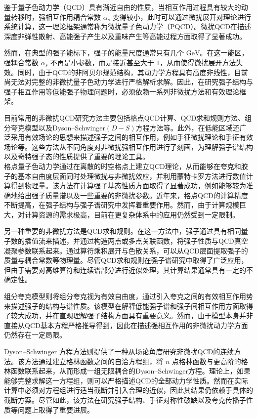 鉴于量子色动力学（QCD）具有渐近自由的性质，当相互作用过程具有较大的动量转移时，强相互作用耦合常数 $\alpha_s$ 变得较小，此时可以通过微扰展开对理论进行系统计算，这一理论框架通常称为微扰量子色动力学（PQCD）。微扰QCD在描述深度非弹性散射、高能强子产生以及重味产生等高能过程方面取得了显著成功。

然而，在典型的强子能标下，强子的能量尺度通常只有几个 $\mathrm{GeV}$。在这一能区，强耦合常数 $\alpha_s$ 不再是小参数，而是接近甚至大于 $1$，从而使得微扰展开方法失效。同时，由于QCD的非阿贝尔规范结构，其动力学方程具有高度非线性，目前尚无法对完整的非微扰量子色动力学进行严格解析求解。因此，在研究强子结构与强子相互作用等低能强子物理问题时，必须依赖一系列非微扰方法和有效理论框架。

目前常用的非微扰QCD研究方法主要包括格点QCD计算、QCD求和规则方法、组分夸克模型以及Dyson--Schwinger$(D-S)$方程方法等。此外，在低能区域还广泛采用有效场论的思想来描述强子之间的相互作用，例如手征微扰理论和手征有效场论等。这些方法从不同角度对非微扰强相互作用进行了刻画，为理解强子谱结构以及奇特强子态的性质提供了重要的理论工具。\\

格点量子色动力学通过在离散的时空格点上建立QCD理论，从而能够在夸克和胶子的基本自由度层面同时处理微扰与非微扰效应，并利用蒙特卡罗方法进行数值计算得到物理量。该方法在计算强子基态性质方面取得了显著成功，例如能够较为准确地给出强子质量谱以及一些重要的非微扰参数。近年来，格点QCD的计算精度不断提高，在强子结构与强子谱研究中发挥着重要作用。然而，由于计算规模巨大，对计算资源的需求极高，目前在更复杂体系中的应用仍然受到一定限制。

另一种重要的非微扰方法是QCD求和规则。在这一方法中，强子通过具有相同量子数的插值流来描述，并通过构造两点或多点关联函数，将强子性质与QCD真空凝聚参数联系起来。通过算符乘积展开与色散关系，可以从QCD层面提取强子的质量与耦合常数等物理量。尽管QCD求和规则在强子谱研究中取得了广泛应用，但由于需要对高维算符和连续谱部分进行近似处理，其计算结果通常具有一定的不确定性。

组分夸克模型则将组分夸克视为有效自由度，通过引入夸克之间的有效相互作用势来描述强子的结构与谱性质。该模型在解释低能强子谱和强子间相互作用方面取得了较大成功，并在直观理解强子结构方面具有重要意义。然而，由于模型本身并非直接从QCD基本方程严格推导得到，因此在描述强相互作用的非微扰动力学方面仍然存在一定局限。

Dyson--Schwinger 方程方法则提供了一种从场论角度研究非微扰QCD的连续方法。该方法通过建立格林函数之间的自洽方程组，将 $n$ 点格林函数与更高阶的格林函数联系起来，从而形成一组无限耦合的Dyson--Schwinger方程。理论上，如果能够完整求解这一方程组，则可以严格描述QCD的全部动力学性质。然而在实际计算中必须对方程组进行适当截断并引入合理的近似，因此其结果仍依赖于具体的截断方案。尽管如此，该方法在研究强子结构、手征对称性破缺以及夸克传播子性质等问题上取得了重要进展。

